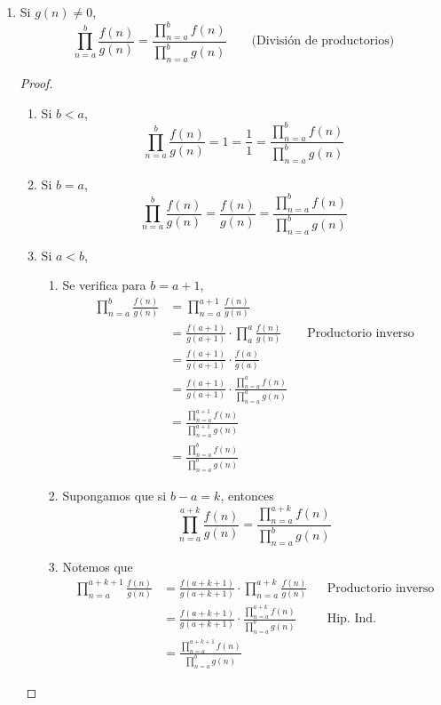 \begin{enumerate}[label=\alph*)]
    \item Si $g(n)\neq 0$, \[\prod_{n=a}^{b} \frac{f(n)}{g(n)} = \frac{\prod_{n=a}^{b}f(n)}{\prod_{n=a}^{b}g(n)} \qquad \text{(División de productorios)}\]
    \begin{proof}\leavevmode
      \begin{enumerate}[label=\Roman*)]
        \item Si $b<a$, \[\prod_{n=a}^{b} \frac{f(n)}{g(n)} = 1 = \frac{1}{1} = \frac{\prod_{n=a}^{b}f(n)}{\prod_{n=a}^{b}g(n)}\]
        \item Si $b=a$, \[\prod_{n=a}^{b} \frac{f(n)}{g(n)} = \frac{f(n)}{g(n)} = \frac{\prod_{n=a}^{b}f(n)}{\prod_{n=a}^{b}g(n)}\]
        \item Si $a<b$,
        \begin{enumerate}[label=\roman*)]
          \item Se verifica para $b=a+1$,
          \begin{align*}
            \prod_{n=a}^{b} \frac{f(n)}{g(n)} &= \prod_{n=a}^{a+1} \frac{f(n)}{g(n)}\\
            &= \frac{f(a+1)}{g(a+1)} \cdot \prod_{a}^{a} \frac{f(n)}{g(n)}&& \text{Productorio inverso}\\
            &= \frac{f(a+1)}{g(a+1)} \cdot \frac{f(a)}{g(a)}\\
            &= \frac{f(a+1)}{g(a+1)} \cdot \frac{\prod_{n=a}^{a} f(n)}{\prod_{n=a}^{a} g(n)}\\
            &= \frac{\prod_{n=a}^{a+1}f(n)}{\prod_{n=a}^{a+1}g(n)}\\
            &= \frac{\prod_{n=a}^{b}f(n)}{\prod_{n=a}^{b}g(n)}
          \end{align*}
          \item Supongamos que si $b-a=k$, entonces
          \[\prod_{n=a}^{a+k} \frac{f(n)}{g(n)} = \frac{\prod_{n=a}^{a+k}f(n)}{\prod_{n=a}^{b}g(n)}\] 
          \item Notemos que
          \begin{align*}
            \prod_{n=a}^{a+k+1} \frac{f(n)}{g(n)} &= \frac{f(a+k+1)}{g(a+k+1)} \cdot \prod_{n=a}^{a+k} \frac{f(n)}{g(n)} && \text{Productorio inverso}\\
            &= \frac{f(a+k+1)}{g(a+k+1)} \cdot \frac{\prod_{n=a}^{a+k}f(n)}{\prod_{n=a}^{b}g(n)} && \text{Hip. Ind.}\\
            &= \frac{\prod_{n=a}^{a+k+1}f(n)}{\prod_{n=a}^{b}g(n)}
          \end{align*}
        \end{enumerate}
      \end{enumerate}
    \end{proof}
    

\end{enumerate}
